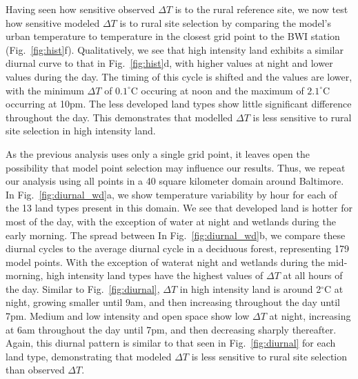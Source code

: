 \documentclass[draft,linenumbers]{agujournal}
\begin{document}
Having seen how sensitive observed $\Delta T$ is to the rural reference site, we now test how sensitive modeled $\Delta T$ is to rural site selection by comparing the model's urban temperature to temperature in the closest grid point to the BWI station (Fig.~\ref{fig:hist}f).
Qualitatively, we see that high intensity land exhibits a similar diurnal curve to that in Fig.~\ref{fig:hist}d, with higher values at night and lower values during the day. The timing of this cycle is shifted and the values are lower, with the minimum $\Delta T$ of $0.1^\circ$C occuring at noon and the maximum of $2.1^\circ$C occurring at 10pm. The less developed land types show little significant difference throughout the day. 
This demonstrates that modelled $\Delta T$ is less sensitive to rural site selection in high intensity land. 

As the previous analysis uses only a single grid point, it leaves open the possibility that model point selection may influence our results. Thus, we repeat our analysis using all points in a 40 square kilometer domain around Baltimore. In Fig.~\ref{fig:diurnal_wd}a, we show temperature variability by hour for each of the 13 land types present in this domain. We see that developed land is hotter for most of the day, with the exception of water at night and wetlands during the early morning. The spread between 
In Fig.~\ref{fig:diurnal_wd}b, we compare these diurnal cycles to the average diurnal cycle in a deciduous forest, representing 179 model points. With the exception of waterat night and wetlands during the mid-morning, high intensity land types have the highest values of $\Delta T$ at all hours of the day. Similar to Fig.~\ref{fig:diurnal}, $\Delta T$ in high intensity land is around 2$^\circ$C at night, growing smaller until 9am, and then increasing throughout the day until 7pm. Medium and low intensity and open space show low $\Delta T$ at night, increasing at 6am throughout the day until 7pm, and then decreasing sharply thereafter. Again, this diurnal pattern is similar to that seen in Fig.~\ref{fig:diurnal} for each land type, demonstrating that modeled $\Delta T$ is less sensitive to rural site selection than observed $\Delta T$. 
 
\end{document}
